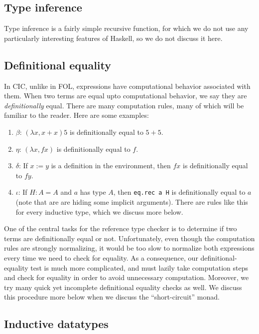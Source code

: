 \documentclass{article}
\begin{document}
\begin{spacing}{1.1}
\subsection{Type inference}

Type inference is a fairly simple recursive function, for which we do not use any particularly interesting features of Haskell, so we do not discuss it here.

\subsection{Definitional equality}

In CIC, unlike in FOL, expressions have computational behavior associated with them. When two terms are equal upto computational behavior, we say they are \emph{definitionally} equal. There are many computation rules, many of which will be familiar to the reader. Here are some examples:
\begin{enumerate}
\item \( \beta \): \( (\lambda x, x + x) 5 \) is definitionally equal to \( 5 + 5 \).
\item \( \eta \): \( (\lambda x, f x) \) is definitionally equal to \( f \).
\item \( \delta \): If \( x := y \) is a definition in the environment, then \( f x \) is definitionally equal to \( f y \).
\item \( \iota \): If \( H : A = A \) and \( a \) has type \( A \), then \lstinline{eq.rec a H} is definitionally equal to \( a \) (note that are are hiding some implicit arguments). There are rules like this for every inductive type, which we discuss more below.
\end{enumerate}

One of the central tasks for the reference type checker is to determine if two terms are definitionally equal or not. Unfortunately, even though the computation rules are strongly normalizing, it would be too slow to normalize both expressions every time we need to check for equality. As a consequence, our definitional-equality test is much more complicated, and must lazily take computation steps and check for equality in order to avoid unnecessary computation. Moreover, we try many quick yet incomplete definitional equality checks as well. We discuss this procedure more below when we discuss the ``short-circuit'' monad.

\subsection{Inductive datatypes}


\end{spacing}
\end{document}
